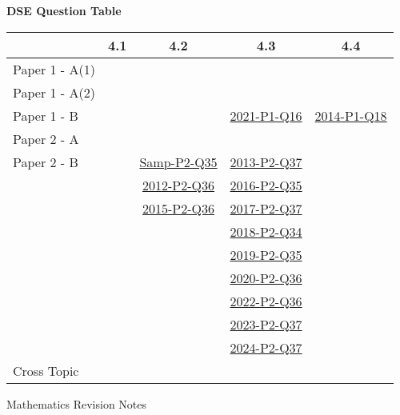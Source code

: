 \documentclass[12pt, a4paper]{article}
\begin{document}
\begin{absolutelynopagebreak}
\begin{center}
\textbf{DSE Question Table}
\end{center}
\begin{center}
\begin{tabular}{|l|c|c|c|c|}
\hline
        & 4.1 & 4.2 & 4.3 & 4.4 \\\hline
\hline
Paper 1 - A(1)&  &  &  &  \\
\hline
Paper 1 - A(2)&  &  &  &  \\
\hline
Paper 1 - B&  &  & \hyperref[DSE2021-CoreP1-Q16]{2021-P1-Q16} & \hyperref[DSE2014-CoreP1-Q18]{2014-P1-Q18} \\
\hline
\hline
Paper 2 - A&  &  &  &  \\
\hline
Paper 2 - B&  & \hyperref[DSE2012S-CoreP2-Q35]{Samp-P2-Q35} & \hyperref[DSE2013-CoreP2-Q37]{2013-P2-Q37} &  \\
&  & \hyperref[DSE2012-CoreP2-Q36]{2012-P2-Q36} & \hyperref[DSE2016-CoreP2-Q35]{2016-P2-Q35} &  \\
&  & \hyperref[DSE2015-CoreP2-Q36]{2015-P2-Q36} & \hyperref[DSE2017-CoreP2-Q37]{2017-P2-Q37} &  \\
&  &  & \hyperref[DSE2018-CoreP2-Q34]{2018-P2-Q34} &  \\
&  &  & \hyperref[DSE2019-CoreP2-Q35]{2019-P2-Q35} &  \\
&  &  & \hyperref[DSE2020-CoreP2-Q36]{2020-P2-Q36} &  \\
&  &  & \hyperref[DSE2022-CoreP2-Q36]{2022-P2-Q36} &  \\
&  &  & \hyperref[DSE2023-CoreP2-Q37]{2023-P2-Q37} &  \\
&  &  & \hyperref[DSE2024-CoreP2-Q37]{2024-P2-Q37} &  \\
\hline
\hline
Cross Topic&  &  &  &  \\
\hline
\end{tabular}
\end{center}
\end{absolutelynopagebreak}
\newpage
\newpage
\thispagestyle{empty}
\begin{center}
Mathematics Revision Notes\\\vspace{1cm}
\\\vspace{1cm}
{\fontsize{24pt}{24pt}\selectfont {Applications of Trigonometry in 2-D problems \NF}} \\\vspace{1cm}
\label{chapter:S5-5}

\end{center}
\vspace{0.5cm}
\hline
\end{document}
